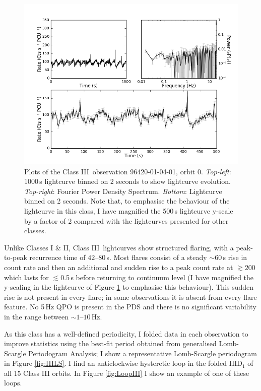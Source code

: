 \begin{figure}
    \includegraphics[width=0.8\columnwidth, trim = 0.6cm 0 3.9cm 0]{images/Gmulti.png}
    \captionsetup{singlelinecheck=off}
    \caption[Characteristic lightcurves and a power spectrum of Type III variability.]{Plots of the Class III\indexiii\ observation 96420-01-04-01, orbit 0.  \textit{Top-left}: 1000\,s lightcurve binned on 2 seconds to show lightcurve evolution.  \textit{Top-right}: Fourier Power Density Spectrum.  \textit{Bottom}: Lightcurve binned on 2 seconds.  Note that, to emphasise the behaviour of the lightcurve in this class, I have magnified the 500\,s lightcurve y-scale by a factor of 2 compared with the lightcurves presented for other classes.}
   \label{fig:Gmulti}
\end{figure}

\par Unlike Classes I \& II, Class III\indexiii\ lightcurves show structured flaring, with a peak-to-peak recurrence time of $42$--$80$\,s.  Most flares consist of a steady $\sim60$\,s rise in count rate and then an additional and sudden rise to a peak count rate at $\gtrsim200$\spcu which lasts for $\lesssim$0.5\,s before returning to continuum level (I have magnified the y-scaling in the lightcurve of Figure \ref{fig:Gmulti} to emphasise this behaviour). This sudden rise is not present in every flare; in some observations it is absent from every flare feature.  No 5\,Hz QPO is present in the PDS and there is no significant variability in the range between $\sim1\mbox{--}10$\,Hz.

\par As this class has a well-defined periodicity, I folded data in each observation to improve statistics using the best-fit period obtained from generalised Lomb-Scargle Periodogram Analysis; I show a representative Lomb-Scargle periodogram in Figure \ref{fig:IIILS}.  I find an anticlockwise hysteretic loop in the folded HID$_1$ of all 15 Class III orbits.  In Figure \ref{fig:LoopIII} I show an example of one of these loops.

